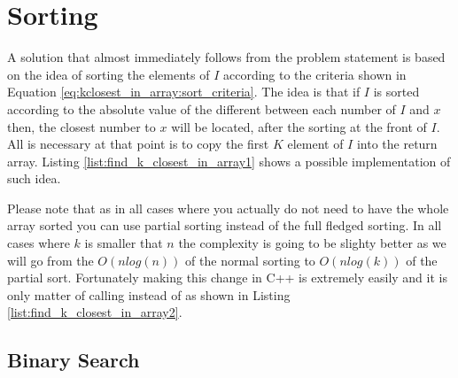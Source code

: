 \section{Sorting}
\label{find_k_closest_in_array:sec:sorting}
A solution that almost immediately follows from the problem statement is based on the idea of sorting the elements of $I$ according to the criteria shown in Equation \ref{eq:kclosest_in_array:sort_criteria}.
The idea is that if $I$ is sorted according to the absolute value of the different between each number of $I$ and $x$ then, the closest number to $x$ will be located, after the sorting at the front of $I$.
All is necessary at that point is to copy the first $K$ element of $I$ into the return array.
Listing \ref{list:find_k_closest_in_array1} shows a possible implementation of such idea. 


Please note that as in all cases where you actually do not need to have the whole array sorted you can use partial sorting instead of the full fledged sorting. In all cases where $k$ is smaller that $n$ the complexity is going to be slighty better as
we will go from the $O(nlog(n))$ of the normal sorting to $O(nlog(k))$ of the partial sort. 
Fortunately making this change in C++ is extremely easily and it is only matter of calling  instead of  as shown in Listing \ref{list:find_k_closest_in_array2}.



\subsection{Binary Search}
\label{find_k_closest_in_array:sec:binary_search}



